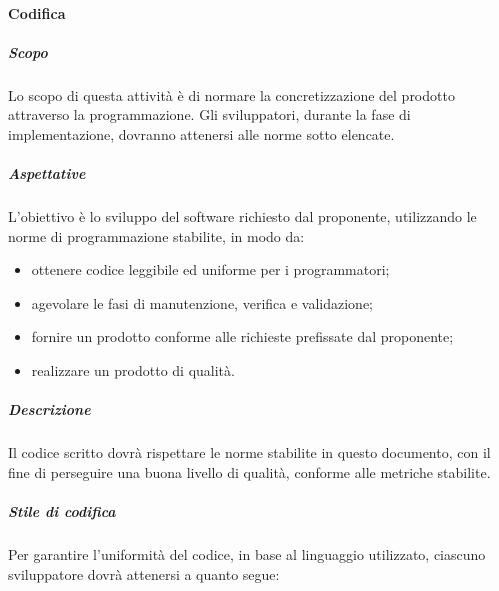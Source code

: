 			\paragraph{Codifica}
				\subparagraph{Scopo}
					Lo scopo di questa attività è di normare la concretizzazione del prodotto attraverso la programmazione. Gli sviluppatori, durante la fase di implementazione, dovranno attenersi alle norme sotto elencate.
				\subparagraph{Aspettative}
					 L'obiettivo è lo sviluppo del software richiesto dal proponente, utilizzando le norme di programmazione stabilite, in modo da:
					 	\begin{itemize}
					 	\item ottenere codice leggibile ed uniforme per i programmatori;
						\item agevolare le fasi di manutenzione, verifica e validazione;
						\item fornire un prodotto conforme alle richieste prefissate dal proponente;
						\item realizzare un prodotto di qualità.
					 \end{itemize}
				 \subparagraph{Descrizione}
				 	Il codice scritto dovrà rispettare le norme stabilite in questo documento, con il fine di perseguire una buona livello di qualità, conforme alle metriche stabilite.
				 \subparagraph{Stile di codifica}
				 	Per garantire l'uniformità del codice, in base al linguaggio utilizzato, ciascuno sviluppatore dovrà attenersi a quanto segue:
